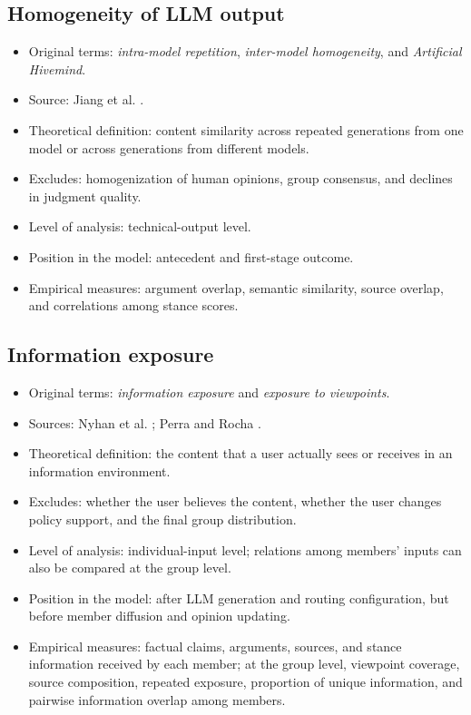 \documentclass[11pt,a4paper]{article}
\newcommand{\term}[1]{\textit{#1}}
\begin{document}
\subsection{Homogeneity of LLM output}

\begin{itemize}
\item Original terms: \term{intra-model repetition}, \term{inter-model homogeneity}, and \term{Artificial Hivemind}.
\item Source: Jiang et al. \cite{jiang2025}.
\item Theoretical definition: content similarity across repeated generations from one model or across generations from different models.
\item Excludes: homogenization of human opinions, group consensus, and declines in judgment quality.
\item Level of analysis: technical-output level.
\item Position in the model: antecedent and first-stage outcome.
\item Empirical measures: argument overlap, semantic similarity, source overlap, and correlations among stance scores.
\end{itemize}

\subsection{Information exposure}

\begin{itemize}
\item Original terms: \term{information exposure} and \term{exposure to viewpoints}.
\item Sources: Nyhan et al. \cite{nyhan2023}; Perra and Rocha \cite{perra2019}.
\item Theoretical definition: the content that a user actually sees or receives in an information environment.
\item Excludes: whether the user believes the content, whether the user changes policy support, and the final group distribution.
\item Level of analysis: individual-input level; relations among members' inputs can also be compared at the group level.
\item Position in the model: after LLM generation and routing configuration, but before member diffusion and opinion updating.
\item Empirical measures: factual claims, arguments, sources, and stance information received by each member; at the group level, viewpoint coverage, source composition, repeated exposure, proportion of unique information, and pairwise information overlap among members.
\end{itemize}
\end{document}
